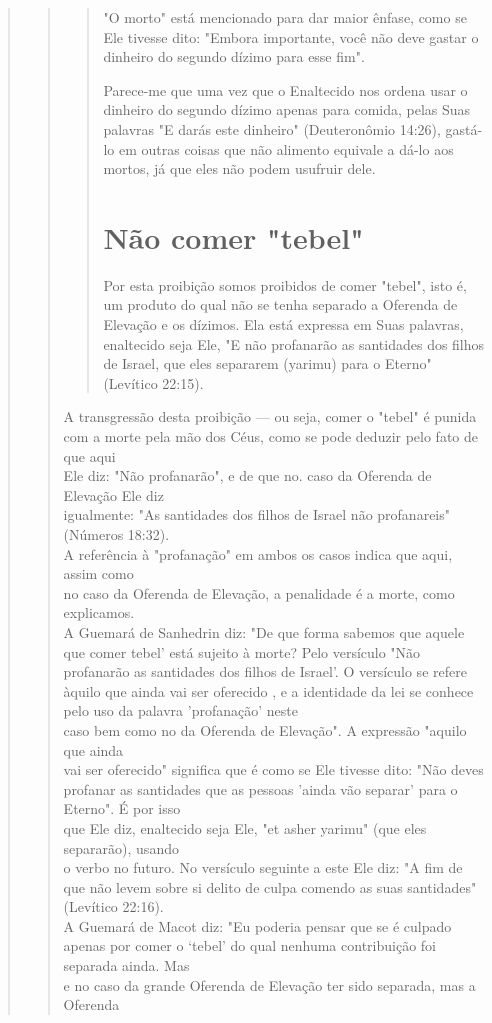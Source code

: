 \begin{quote}
\begin{quote}
\begin{quote}
"O morto" está mencionado para dar maior ênfase, como se Ele ti­vesse
dito: "Embora importante, você não deve gastar o dinheiro do segundo
dízimo para esse fim".

Parece-me que uma vez que o Enaltecido nos ordena usar o dinhei­ro do
segundo dízimo apenas para comida, pelas Suas palavras "E darás este
dinheiro" (Deuteronômio 14:26), gastá-lo em outras coisas que não
alimento equivale a dá-lo aos mortos, já que eles não podem usufruir
dele.

\section{Não comer "tebel"}

Por esta proibição somos proibidos de comer "tebel", isto é, um pro­duto
do qual não se tenha separado a Oferenda de Elevação e os dízimos. Ela
está expressa em Suas palavras, enaltecido seja Ele, "E não profanarão
as santi­dades dos filhos de Israel, que eles separarem (yarimu) para o
Eterno" (Levítico 22:15).
\end{quote}

A transgressão desta proibição --- ou seja, comer o "tebel" é punida\\
com a morte pela mão dos Céus, como se pode deduzir pelo fato de que
aqui\\
Ele diz: "Não profanarão", e de que no. caso da Oferenda de Elevação Ele
diz\\
igualmente: "As santidades dos filhos de Israel não profanareis"
(Números 18:32).\\
A referência à "profanação" em ambos os casos indica que aqui, assim
como\\
no caso da Oferenda de Elevação, a penalidade é a morte, como
explicamos.\\
A Guemará de Sanhedrin diz: "De que forma sabemos que aquele\\
que comer tebel' está sujeito à morte? Pelo versículo "Não profanarão as
santidades
dos filhos de Israel'. O versículo se refere àquilo que ainda vai
ser oferecido
, e a identidade da lei se conhece pelo uso da palavra 'profanação'
neste\\
caso bem como no da Oferenda de Elevação". A expressão "aquilo que
ainda\\
vai ser oferecido" significa que é como se Ele tivesse dito: "Não deves
profanar
as santidades que as pessoas 'ainda vão separar' para o Eterno". É
por isso\\
que Ele diz, enaltecido seja Ele, "et asher yarimu" (que eles
separarão), usando\\
o verbo no futuro. No versículo seguinte a este Ele diz: "A fim de que
não levem
sobre si delito de culpa comendo as suas santidades" (Levítico
22:16).\\
A Guemará de Macot diz: "Eu poderia pensar que se é culpado apenas
por comer o `tebel' do qual nenhuma contribuição foi separada ainda.
Mas\\
e no caso da grande Oferenda de Elevação ter sido separada, mas a
Oferenda


\end{quote}
\end{quote}
